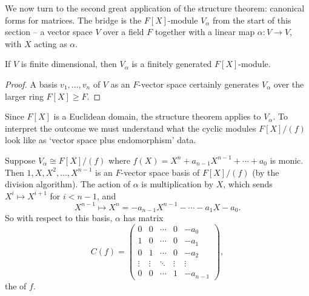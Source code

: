 \documentclass[a4paper]{scrartcl}
\begin{document}
We now turn to the second great application of the structure theorem: canonical forms for matrices. The bridge is the $F[X]$-module $V_{\alpha}$ from the start of this section -- a vector space $V$ over a field $F$ together with a linear map $\alpha: V \rightarrow V$, with $X$ acting as $\alpha$.

\begin{lemma}
	If $V$ is finite dimensional, then $V_{\alpha}$ is a finitely generated $F[X]$-module.
\end{lemma}
\begin{proof}
	A basis $v_1, \dots, v_n$ of $V$ as an $F$-vector space certainly generates $V_\alpha$ over the larger ring $F[X] \geq F$.
\end{proof}

Since $F[X]$ is a Euclidean domain, the structure theorem applies to $V_\alpha$. To interpret the outcome we must understand what the cyclic modules $F[X]/(f)$ look like as `vector space plus endomorphism' data.

\begin{example}
	Suppose $V_{\alpha} \cong F[X]/(f)$ where $f(X) = X^n + a_{n - 1}X^{n -1} + \cdots + a_0$ is monic. Then $1, X, X^2, \dots, X^{n - 1}$ is an $F$-vector space basis of $F[X]/(f)$ (by the division algorithm). The action of $\alpha$ is multiplication by $X$, which sends $X^i \mapsto X^{i + 1}$ for $i < n - 1$, and
	$$
	X^{n - 1} \longmapsto X^n = -a_{n-1}X^{n - 1} - \cdots - a_1 X - a_0.
	$$
	So with respect to this basis, $\alpha$ has matrix
	$$
	C(f) = \begin{pmatrix}
		0 & 0 & \cdots & 0 & -a_0 \\
		1 & 0 & \cdots & 0 & -a_1 \\
		0 & 1 & \cdots & 0 & -a_2 \\
		\vdots & \vdots & \ddots & \vdots & \vdots \\
		0 & 0 & \cdots & 1 & -a_{n - 1}
	\end{pmatrix},
	$$
	the  of $f$.
\end{example}
\end{document}
